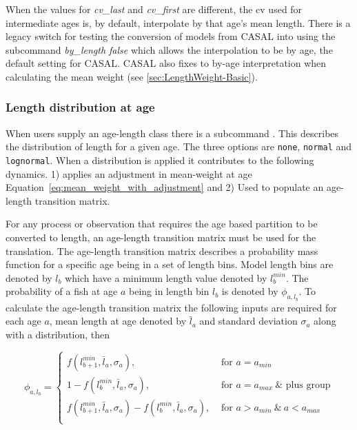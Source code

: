 When the values for \textit{cv\_last} and \textit{cv\_first} are different, the cv used for intermediate ages is, by default, interpolate by that age's mean length. There is a legacy switch for testing the conversion of models from CASAL into \CNAME using the subcommand \textit{by\_length false} which allows the interpolation to be by age, the default setting for CASAL. CASAL also fixes to by-age interpretation when calculating the mean weight (see \ref{sec:LengthWeight-Basic}).

\subsubsection{Length distribution at age}\label{sec:AgeLength-length_at_age}

When users supply an age-length class there is a subcommand . This describes the distribution of length for a given age. The three options are \texttt{none}, \texttt{normal} and \texttt{lognormal}. When a distribution is applied it contributes to the following dynamics. 1) applies an adjustment in mean-weight at age Equation~\ref{eq:mean_weight_with_adjustment} and 2) Used to populate an age-length transition matrix.

For any process or observation that requires the age based partition to be converted to length, an age-length transition matrix must be used for the translation. The age-length transition matrix describes a probability mass function for a specific age being in a set of length bins. Model length bins are denoted by \(l_b\) which have a minimum length value denoted by \(l_b^{min}\). The probability of a fish at age \(a\) being in length bin \(l_b\) is denoted by \(\phi_{a,l_b}\). To calculate the age-length transition matrix the following inputs are required for each age \(a\), mean length at age denoted by \(\bar{l}_a\) and standard deviation \(\sigma_a\) along with a distribution, then

\begin{equation}
	\phi_{a,l_b} = 
	\begin{cases}
		f(l_{b + 1}^{min},\bar{l}_a, \sigma_a), & \text{ for } a = a_{min}\\
		1 - f(l_{b}^{min},\bar{l}_a, \sigma_a), & \text{ for } a = a_{max} \ \& \text{ plus group}\\
		f(l_{b+1}^{min},\bar{l}_a, \sigma_a) - f(l_{b}^{min},\bar{l}_a, \sigma_a), & \text{ for } a > a_{min} \ \& \ a < a_{max} \\				
	\end{cases}
\end{equation}

